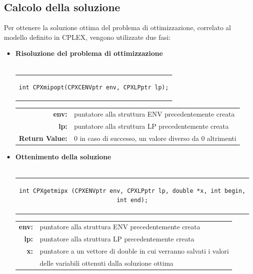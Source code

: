 \subsection{Calcolo della soluzione}
Per ottenere la soluzione ottima del problema di ottimizzazione, correlato al modello definito in CPLEX, vengono utilizzate due fasi:
\begin{itemize}
\item{\textbf{Risoluzione del problema di ottimizzazione}\\\\
\begin{tabular}{c}
\begin{lstlisting}[linewidth=220pt, basicstyle=\footnotesize\sffamily,]
int CPXmipopt(CPXCENVptr env, CPXLPptr lp);
\end{lstlisting}
\end{tabular}
\begin{table}[h]
\centering
\begin{tabular}{rl}
\textbf{env:} & {puntatore alla struttura ENV precedentemente creata}\\
\textbf{lp:} & {puntatore alla struttura LP precedentemente creata}\\
\textbf{Return Value:} & {0 in caso di successo, un valore diverso da 0 altrimenti}\\
\end{tabular}
\end{table}
}
\item{\textbf{Ottenimento della soluzione}\\\\
\begin{tabular}{c}
\begin{lstlisting}[linewidth=380pt, basicstyle=\footnotesize\sffamily,]
int CPXgetmipx (CPXENVptr env, CPXLPptr lp, double *x, int begin, int end);
\end{lstlisting}
\end{tabular}
\vspace{2 cm}
\begin{table}[h]
\centering
\begin{tabular}{rl}
\textbf{env:} & {puntatore alla struttura ENV precedentemente creata}\\
\textbf{lp:} & {puntatore alla struttura LP precedentemente creata}\\
\textbf{x:} & {puntatore a un vettore di double in cui verranno salvati i valori}\\
& {delle variabili ottenuti dalla soluzione ottima}\\

\end{tabular}
\end{table}}
\end{itemize}
